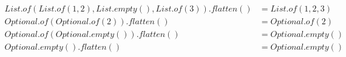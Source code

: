 \begin{align*}
  List.of(List.of(1,2), List.empty(), List.of(3)).flatten() & = List.of(1,2,3) \\
  Optional.of(Optional.of(2)).flatten() & = Optional.of(2) \\
  Optional.of(Optional.empty()).flatten() & = Optional.empty() \\
  Optional.empty().flatten() & = Optional.empty() \\
\end{align*}
